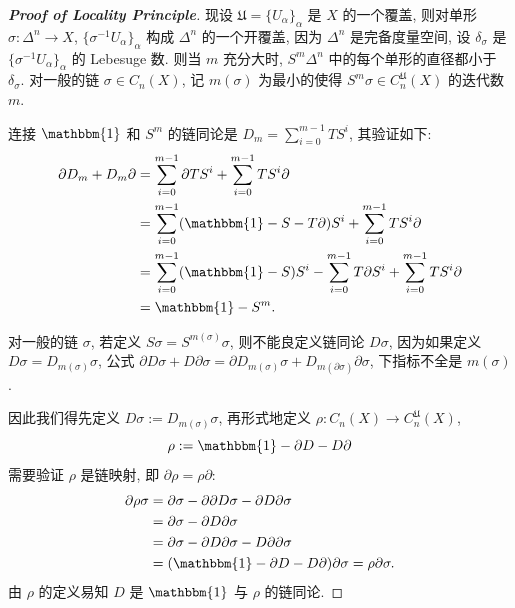 \begin{proof}[{\bf Proof of Locality Principle}]
            现设 $\mathfrak{U}=\{U_{\alpha}\}_{\alpha}$ 是 $X$ 的一个覆盖, 则对单形 $\sigma:\Delta^n\rightarrow X$, $\{\sigma^{-1}U_{\alpha}\}_{\alpha}$ 构成 $\Delta^n$ 的一个开覆盖, 
            因为 $\Delta^n$ 是完备度量空间, 设 $\delta_\sigma$ 是 $\{\sigma^{-1}U_{\alpha}\}_{\alpha}$ 的 Lebesuge 数. 则当 $m$ 充分大时, $S^m\Delta^n$ 中的每个单形的直径都小于 $\delta_\sigma$.
            对一般的链 $\sigma\in C_n(X)$, 记 $m(\sigma)$ 为最小的使得 $S^m\sigma\in C^{\mathfrak{U}}_n(X)$ 的迭代数 $m$.

            连接 $\mathbbm{1}$ 和 $S^m$ 的链同论是 $D_m=\sum\limits_{i=0}^{m-1}TS^i$, 其验证如下:
            \begin{align*}
                \partial D_m + D_m\partial &= \sum_{i=0}^{m-1}\partial TS^i + \sum_{i=0}^{m-1}TS^i\partial \\
                &= \sum_{i=0}^{m-1}(\mathbbm{1} - S - T\partial)S^i + \sum_{i=0}^{m-1}TS^i\partial \\
                &= \sum_{i=0}^{m-1}(\mathbbm{1} - S)S^i - \sum_{i=0}^{m-1}T\partial S^i + \sum_{i=0}^{m-1}TS^i\partial \\
                &= \mathbbm{1} - S^m.
            \end{align*}
           
            对一般的链 $\sigma$, 若定义 $S\sigma = S^{m(\sigma)}\sigma$, 则不能良定义链同论 $D\sigma$, 因为如果定义 $D\sigma = D_{m(\sigma)}\sigma$, 
            公式 $\partial D\sigma+D\partial\sigma = \partial D_{m(\sigma)}\sigma+D_{m(\partial\sigma)}\partial\sigma$, 下指标不全是 $m(\sigma)$. 
             
            因此我们得先定义 $D\sigma := D_{m(\sigma)}\sigma$, 再形式地定义 $\rho:C_n(X)\rightarrow C^{\mathfrak{U}}_n(X)$, 
            \begin{equation*}
                \rho := \mathbbm{1} - \partial D - D\partial
            \end{equation*}
            需要验证 $\rho$ 是链映射, 即 $\partial\rho=\rho\partial$:
            \begin{align*}
                \partial\rho\sigma &= \partial\sigma - \partial\partial D\sigma - \partial D\partial\sigma \\
                &= \partial\sigma - \partial D\partial\sigma \\
                &= \partial\sigma - \partial D\partial\sigma - D\partial\partial\sigma \\
                &= (\mathbbm{1} - \partial D - D\partial)\partial\sigma = \rho\partial\sigma.
            \end{align*}
            由 $\rho$ 的定义易知 $D$ 是 $\mathbbm{1}$ 与 $\rho$ 的链同论.


\end{proof}
